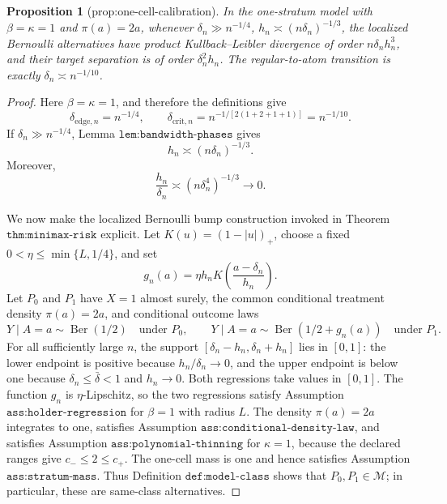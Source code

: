 \documentclass{article}
\newtheorem{proposition}{Proposition}
\begin{document}
\begin{proposition}[prop:one-cell-calibration]\label{prop:one-cell-calibration}
In the one-stratum model with \(\beta=\kappa=1\) and \(\pi(a)=2a\), whenever \(\delta_n\gg n^{-1/4}\), \(h_n\asymp(n\delta_n)^{-1/3}\), the localized Bernoulli alternatives have product Kullback--Leibler divergence of order \(n\delta_n h_n^3\), and their target separation is of order \(\delta_n^2h_n\). The regular-to-atom transition is exactly \(\delta_n\asymp n^{-1/10}\).
\end{proposition}
\begin{proof}
Here \(\beta=\kappa=1\), and therefore the definitions give
\[
 \delta_{\mathrm{edge},n}=n^{-1/4},
 \qquad
 \delta_{\mathrm{crit},n}
 =n^{-1/[2(1+2+1+1)]}=n^{-1/10}.
\]
If \(\delta_n\gg n^{-1/4}\), Lemma \(\texttt{lem:bandwidth-phases}\) gives
\[
 h_n\asymp(n\delta_n)^{-1/3}.
\]
Moreover,
\[
 \frac{h_n}{\delta_n}
 \asymp(n\delta_n^4)^{-1/3}\longrightarrow0.
\]

We now make the localized Bernoulli bump construction invoked in Theorem \(\texttt{thm:minimax-risk}\) explicit.  Let \(K(u)=(1-|u|)_+\), choose a fixed \(0<\eta\leq\min\{L,1/4\}\), and set
\[
 g_n(a)=\eta h_nK\left(\frac{a-\delta_n}{h_n}\right).
\]
Let \(P_0\) and \(P_1\) have \(X=1\) almost surely, the common conditional treatment density \(\pi(a)=2a\), and conditional outcome laws
\[
 Y\mid A=a\sim\operatorname{Ber}(1/2)
 \quad\text{under }P_0,
 \qquad
 Y\mid A=a\sim\operatorname{Ber}(1/2+g_n(a))
 \quad\text{under }P_1.
\]
For all sufficiently large \(n\), the support \([\delta_n-h_n,\delta_n+h_n]\) lies in \([0,1]\): the lower endpoint is positive because \(h_n/\delta_n\to0\), and the upper endpoint is below one because \(\delta_n\leq\bar\delta<1\) and \(h_n\to0\).  Both regressions take values in \([0,1]\).  The function \(g_n\) is \(\eta\)-Lipschitz, so the two regressions satisfy Assumption \(\texttt{ass:holder-regression}\) for \(\beta=1\) with radius \(L\).  The density \(\pi(a)=2a\) integrates to one, satisfies Assumption \(\texttt{ass:conditional-density-law}\), and satisfies Assumption \(\texttt{ass:polynomial-thinning}\) for \(\kappa=1\), because the declared ranges give \(c_-\leq2\leq c_+\).  The one-cell mass is one and hence satisfies Assumption \(\texttt{ass:stratum-mass}\).  Thus Definition \(\texttt{def:model-class}\) shows that \(P_0,P_1\in\mathcal M\); in particular, these are same-class alternatives.


\end{proof}
\end{document}
